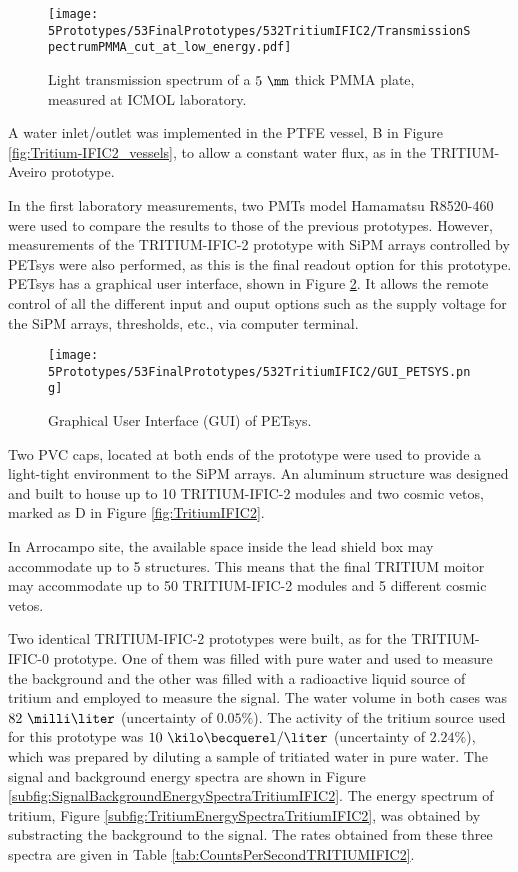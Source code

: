 \begin{figure}[h]
\centering
\texttt{[image: 5Prototypes/53FinalPrototypes/532TritiumIFIC2/TransmissionSpectrumPMMA\_cut\_at\_low\_energy.pdf]}
\caption{Light transmission spectrum of a $5~\mm$ thick PMMA plate, measured at ICMOL laboratory. \label{fig:PMMATransmissionSpectrum}}
\end{figure}	

A water inlet/outlet was implemented in the PTFE vessel, B in Figure \ref{fig:Tritium-IFIC2_vessels}, to allow a constant water flux, as in the TRITIUM-Aveiro prototype.

In the first laboratory measurements, two PMTs model Hamamatsu R8520-460 \cite{DataSheetPMTs} were used to compare the results to those of the previous prototypes. However, measurements of the TRITIUM-IFIC-2 prototype with SiPM arrays controlled by PETsys were also performed, as this is the final readout option for this prototype. PETsys has a graphical user interface, shown in Figure \ref{fig:GUI_PETSYS}. It allows the remote control of all the different input and ouput options such as the supply voltage for the SiPM arrays, thresholds, etc., via computer terminal. 

\begin{figure}[h]
\centering
\texttt{[image: 5Prototypes/53FinalPrototypes/532TritiumIFIC2/GUI\_PETSYS.png]}
\caption{Graphical User Interface (GUI) of PETsys.\label{fig:GUI_PETSYS}}
\end{figure}

Two PVC caps, located at both ends of the prototype were used to provide a light-tight environment to the SiPM arrays. An aluminum structure was designed and built to house up to 10 TRITIUM-IFIC-2 modules and two cosmic vetos, marked as D in Figure \ref{fig:TritiumIFIC2}.

In Arrocampo site, the available space inside the lead shield box may accommodate up to 5 structures. This means that the final TRITIUM moitor may accommodate up to 50 TRITIUM-IFIC-2 modules and 5 different cosmic vetos.

Two identical TRITIUM-IFIC-2 prototypes were built, as for the TRITIUM-IFIC-0 prototype. One of them was filled with pure water and used to measure the background and the other was filled with a radioactive liquid source of tritium and employed to measure the signal. The water volume in both cases was $82~\milli\liter$ (uncertainty of $0.05\%$). The activity of the tritium source used for this prototype was $10~\kilo\becquerel/\liter$ (uncertainty of $2.24\%$), which was prepared by diluting a sample of tritiated water in pure water. The signal and background energy spectra are shown in Figure \ref{subfig:SignalBackgroundEnergySpectraTritiumIFIC2}. The energy spectrum of tritium, Figure \ref{subfig:TritiumEnergySpectraTritiumIFIC2}, was obtained by substracting the background to the signal. The rates obtained from these three spectra are given in Table \ref{tab:CountsPerSecondTRITIUMIFIC2}. 

